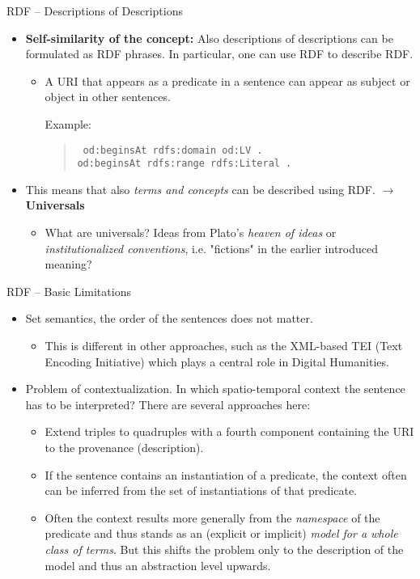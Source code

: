 \documentclass{beamer}
\begin{document}
\begin{frame}{RDF -- Descriptions of Descriptions}
\begin{itemize}
\item \textbf{Self-similarity of the concept:} Also descriptions of
  descriptions can be formulated as RDF phrases. In particular, one can use
  RDF to describe RDF.
  \begin{itemize}
  \item A URI that appears as a predicate in a sentence can appear as subject
    or object in other sentences.
  
    Example:
    \begin{quote}\tt      
      od:beginsAt rdfs:domain od:LV .\\
      od:beginsAt rdfs:range rdfs:Literal .
    \end{quote}
  \end{itemize}
\item This means that also \emph{terms and concepts} can be described using
  RDF. $\to$ \textbf{Universals}
  \begin{itemize}
  \item What are universals? Ideas from Plato's \emph{heaven of ideas} or
    \emph{institutionalized conventions}, i.e. "fictions" in the earlier
    introduced meaning? 
  \end{itemize}
\end{itemize}
\end{frame}
\begin{frame}{RDF -- Basic Limitations}
\begin{itemize}
\item Set semantics, the order of the sentences does not matter.
  \begin{itemize}
  \item This is different in other approaches, such as the XML-based TEI (Text
    Encoding Initiative) which plays a central role in Digital Humanities.
  \end{itemize}
\item Problem of contextualization. In which spatio-temporal context the
  sentence has to be interpreted? There are several approaches here:
  \begin{itemize}
  \item Extend triples to quadruples with a fourth component containing the
    URI to the provenance (description).
  \item If the sentence contains an instantiation of a predicate, the context
    often can be inferred from the set of instantiations of that predicate.
  \item Often the context results more generally from the \emph{namespace} of
    the predicate and thus stands as an (explicit or implicit) \emph{model for
      a whole class of terms}.  But this shifts the problem only to the
    description of the model and thus an abstraction level upwards.
  \end{itemize}
\end{itemize}
\end{frame}
\end{document}
